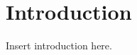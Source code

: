 \documentclass[
10pt, %
oneside, %
english, %
onehalfspacing, %
]{McMasterThesis} %
\begin{document}
\section*{\Huge Introduction} 
Insert introduction here.





\hspace{\parindent}




\tableofcontents %






 
\end{document}
